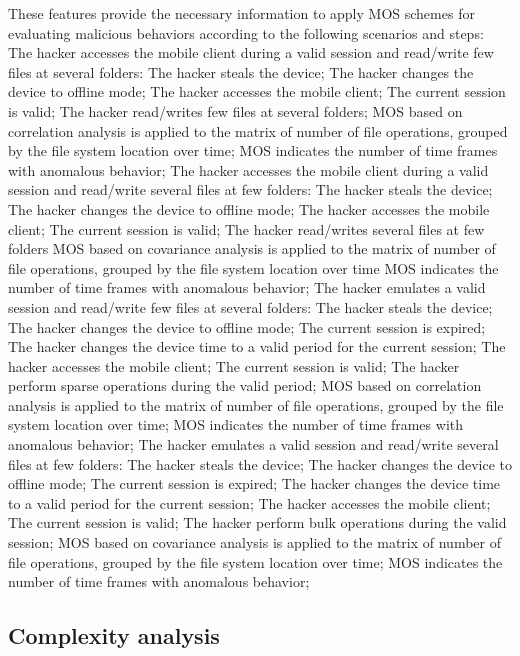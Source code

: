 \documentclass[twocolumn]{svjour3}          %
\begin{document}
These features provide the necessary information to apply MOS schemes for evaluating malicious behaviors according to the following scenarios and steps:
The hacker accesses the mobile client during a valid session and read/write few files at several folders:
The hacker steals the device;
The hacker changes the device to offline mode;
The hacker accesses the mobile client;
The current session is valid;
The hacker read/writes few files at several folders;
MOS based on correlation analysis is applied to the matrix of number of file operations, grouped by the file system location over time;
MOS indicates the number of time frames with anomalous behavior;
The hacker accesses the mobile client during a valid session and read/write several files at few folders:
The hacker steals the device;
The hacker changes the device to offline mode;
The hacker accesses the mobile client;
The current session is valid;
The hacker read/writes several files at few folders
MOS based on covariance analysis is applied to the matrix of number of file operations, grouped by the file system location over time
MOS indicates the number of time frames with anomalous behavior;
The hacker emulates a valid session and read/write few files at several folders: 
The hacker steals the device;
The hacker changes the device to offline mode;
The current session is expired;
The hacker changes the device time to a valid period for the current session;
The hacker accesses the mobile client;
The current session is valid;
The hacker perform sparse operations during the valid period;
MOS based on correlation analysis is applied to the matrix of number of file operations, grouped by the file system location over time;
MOS indicates the number of time frames with anomalous behavior;
The hacker emulates a valid session and read/write several files at few folders: 
The hacker steals the device;
The hacker changes the device to offline mode;
The current session is expired;
The hacker changes the device time to a valid period for the current session;
The hacker accesses the mobile client;
The current session is valid;
The hacker perform bulk operations during the valid session;
MOS based on covariance analysis is applied to the matrix of number of file operations, grouped by the file system location over time;
MOS indicates the number of time frames with anomalous behavior;

\subsection{Complexity analysis }
\label{sec_complex}
\end{document}

